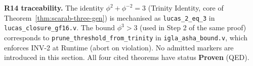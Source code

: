\noindent
\textbf{R14 traceability.}
The identity $\phi^2+\phi^{-2}=3$ (Trinity Identity, core of
Theorem~\ref{thm:scarab-three-gen}) is mechanised as
\texttt{lucas\_2\_eq\_3} in \texttt{lucas\_closure\_gf16.v}.
The bound $\phi^3 > 3$ (used in Step 2 of the same proof) corresponds
to \texttt{prune\_threshold\_from\_trinity} in
\texttt{igla\_asha\_bound.v}, which enforces INV-2 at Runtime (abort
on violation).  No admitted markers are introduced in this section.
All four cited theorems have status \textbf{Proven} (QED).

%
%
%
%
%
%
%
